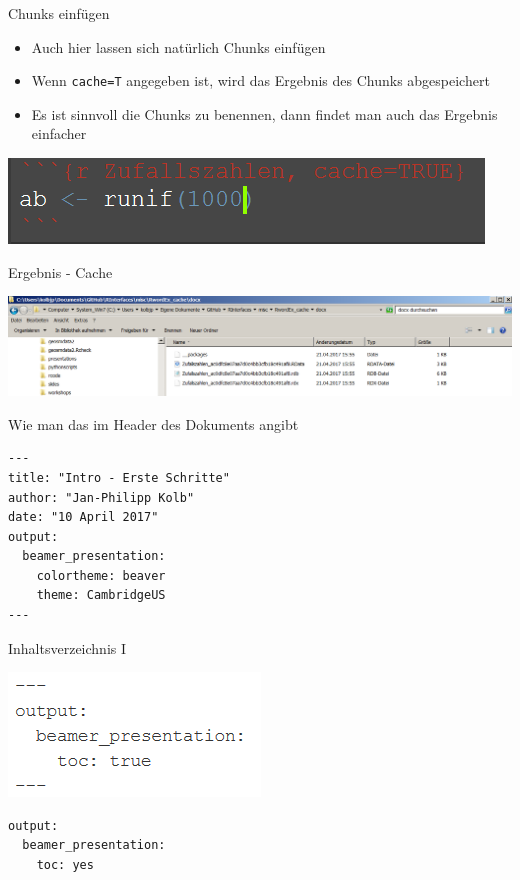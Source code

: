 \documentclass[ignorenonframetext,]{beamer}
\providecommand{\tightlist}{%
\setlength{\itemsep}{0pt}\setlength{\parskip}{0pt}}
\begin{document}
\begin{frame}[fragile]{Chunks einfügen}

\begin{itemize}
\tightlist
\item
  Auch hier lassen sich natürlich Chunks einfügen
\item
  Wenn \texttt{cache=T} angegeben ist, wird das Ergebnis des Chunks
  abgespeichert
\item
  Es ist sinnvoll die Chunks zu benennen, dann findet man auch das
  Ergebnis einfacher
\end{itemize}

\includegraphics{./tex2pdf.956/3ccd44bfe08a5bc7c01d030ca7a9c2acfc99796d.png}

\end{frame}

\begin{frame}{Ergebnis - Cache}

\includegraphics{./tex2pdf.956/236a6b84c9c2066a106676a0362f55c3f26b4998.png}

\end{frame}

\begin{frame}[fragile]{Wie man das im Header des Dokuments angibt}

\begin{verbatim}
---
title: "Intro - Erste Schritte"
author: "Jan-Philipp Kolb"
date: "10 April 2017"
output:
  beamer_presentation: 
    colortheme: beaver
    theme: CambridgeUS
---
\end{verbatim}

\end{frame}

\begin{frame}[fragile]{Inhaltsverzeichnis I}

\includegraphics{./tex2pdf.956/c6f4f3b8a4cec040a5f0ba257de6936cf3189beb.png}

\begin{verbatim}
output: 
  beamer_presentation: 
    toc: yes
\end{verbatim}

\end{frame}
\end{document}
